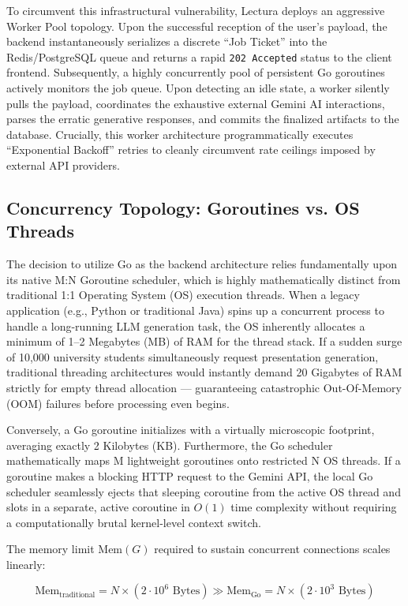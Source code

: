 To circumvent this infrastructural vulnerability, Lectura deploys an aggressive Worker Pool topology. Upon the successful reception of the user’s payload, the backend instantaneously serializes a discrete ``Job Ticket'' into the Redis/PostgreSQL queue and returns a rapid \texttt{202 Accepted} status to the client frontend. Subsequently, a highly concurrently pool of persistent Go goroutines actively monitors the job queue. Upon detecting an idle state, a worker silently pulls the payload, coordinates the exhaustive external Gemini AI interactions, parses the erratic generative responses, and commits the finalized artifacts to the database. Crucially, this worker architecture programmatically executes ``Exponential Backoff'' retries to cleanly circumvent rate ceilings imposed by external API providers.

\subsection{Concurrency Topology: Goroutines vs. OS Threads}
The decision to utilize Go as the backend architecture relies fundamentally upon its native M:N Goroutine scheduler, which is highly mathematically distinct from traditional 1:1 Operating System (OS) execution threads. When a legacy application (e.g., Python or traditional Java) spins up a concurrent process to handle a long-running LLM generation task, the OS inherently allocates a minimum of 1–2 Megabytes (MB) of RAM for the thread stack. If a sudden surge of 10,000 university students simultaneously request presentation generation, traditional threading architectures would instantly demand 20 Gigabytes of RAM strictly for empty thread allocation — guaranteeing catastrophic Out-Of-Memory (OOM) failures before processing even begins.

Conversely, a Go goroutine initializes with a virtually microscopic footprint, averaging exactly 2 Kilobytes (KB). Furthermore, the Go scheduler mathematically maps M lightweight goroutines onto restricted N OS threads. If a goroutine makes a blocking HTTP request to the Gemini API, the local Go scheduler seamlessly ejects that sleeping coroutine from the active OS thread and slots in a separate, active coroutine in $O(1)$ time complexity without requiring a computationally brutal kernel-level context switch.

The memory limit $\text{Mem}(G)$ required to sustain concurrent connections scales linearly:

\begin{equation}
    \text{Mem}_{\text{traditional}} = N \times (2 \cdot 10^6 \text{ Bytes}) \gg \text{Mem}_{\text{Go}} = N \times (2 \cdot 10^3 \text{ Bytes})
\end{equation}

